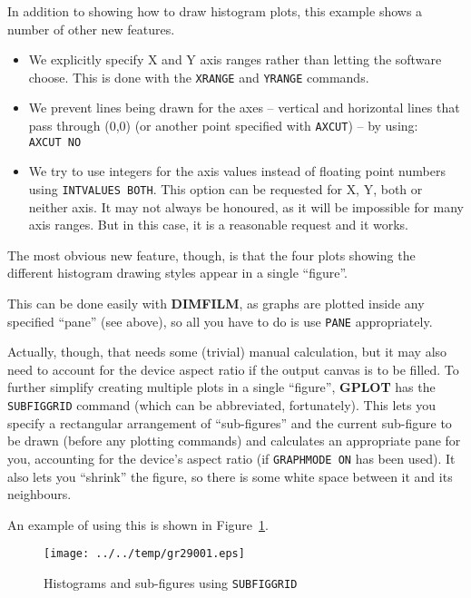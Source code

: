 \documentclass[a4paper,twoside,11pt]{article}
\makeatletter
\def\maxwidth{%
  \ifdim\Gin@nat@width>\linewidth
    \linewidth
  \else
    \Gin@nat@width
  \fi
}
\newcommand{\newpara}{\par\vspace{4mm}\noindent}
\makeatother
\begin{document}
\newpara
In addition to showing how to draw histogram plots, this example shows a
number of other new features.

\begin{itemize}
\item
  We explicitly specify X and Y axis ranges rather than letting the
  software choose. This is done with the \texttt{XRANGE} and
  \texttt{YRANGE} commands.
\item
  We prevent lines being drawn for the axes -- vertical and horizontal
  lines that pass through (0,0) (or another point specified with
  \texttt{AXCUT}) -- by using: \texttt{AXCUT\ NO}
\item
  We try to use integers for the axis values instead of floating point
  numbers using \texttt{INTVALUES\ BOTH}. This option can be requested
  for X, Y, both or neither axis. It may not always be honoured, as it
  will be impossible for many axis ranges. But in this case, it is a
  reasonable request and it works.
\end{itemize}

\newpara
The most obvious new feature, though, is that the four plots showing the
different histogram drawing styles appear in a single ``figure''.

\newpara
This can be done easily with \textbf{DIMFILM}, as graphs are plotted inside any
specified ``pane'' (see above), so all you have to do is use
\texttt{PANE} appropriately.

\newpara
Actually, though, that needs some (trivial) manual calculation, but it
may also need to account for the device aspect ratio if the output
canvas is to be filled. To further simplify creating multiple plots in a
single ``figure'', \textbf{GPLOT} has the \texttt{SUBFIGGRID} command (which can
be abbreviated, fortunately). This lets you specify a rectangular
arrangement of ``sub-figures'' and the current sub-figure to be drawn
(before any plotting commands) and calculates an appropriate pane for
you, accounting for the device's aspect ratio (if \texttt{GRAPHMODE\ ON}
has been used). It also lets you ``shrink'' the figure, so there is some
white space between it and its neighbours.

\newpara
An example of using this is shown in Figure~\ref{fig:gr29001}.

\begin{figure}
  \centering
  \texttt{[image: ../../temp/gr29001.eps]}
  \caption{Histograms and sub-figures using \texttt{SUBFIGGRID}}
  \label{fig:gr29001}
\end{figure}
\end{document}
